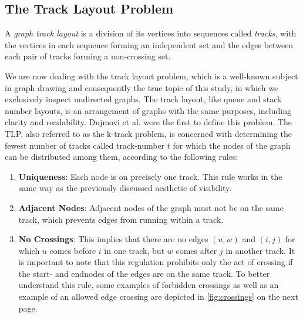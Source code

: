 \documentclass[bachelor, english]{algothesis}
\begin{document}
\subsection{The Track Layout Problem}
    \label{chap:track}
\begin{definition}
    A \emph{graph track layout} is a division of its vertices into sequences called \emph{tracks}, with the vertices in each sequence forming an independent set and the edges between each pair of tracks forming a non-crossing set.
\end{definition}
\noindent
We are now dealing with the track layout problem, which is a well-known subject in graph drawing and consequently the true topic of this study, in which we exclusively inspect undirected graphs. The track layout, like queue and stack number layouts, is an arrangement of graphs with the same purposes, including clarity and readability. Dujmovi et al. \cite{track_layout} were the first to define this problem. The TLP, also referred to as the k-track problem, is concerned with determining the fewest number of tracks called track-number $t$ for which the nodes of the graph can be distributed among them, according to the following rules:
\begin{enumerate}
    \item \textbf{Uniqueness}: Each node is on precisely one track. This rule works in the same way as the previously discussed aesthetic of visibility.
    \item \textbf{Adjacent Nodes}: Adjacent nodes of the graph must not be on the same track, which prevents edges from running within a track.
    \item \textbf{No Crossings}: This implies that there are no edges $(u,w)$ and $(i,j)$ for which $u$ comes before $i$ in one track, but $w$ comes after $j$ in another track. It is important to note that this regulation prohibits only the act of crossing if the start- and endnodes of the edges are on the same track. To better understand this rule, some examples of forbidden crossings as well as an example of an allowed edge crossing are depicted in \cref{fig:crossings} on the next page.
\end{enumerate}
\end{document}
